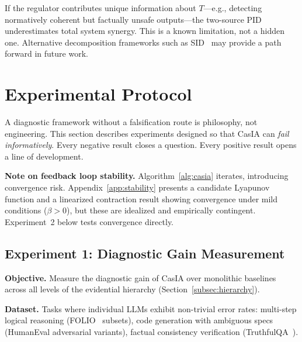 \documentclass[11pt,a4paper]{article}
\theoremstyle{definition}
\begin{document}
If the regulator contributes unique information about $T$---e.g., detecting normatively coherent but factually unsafe outputs---the two-source PID underestimates total system synergy. This is a known limitation, not a hidden one. Alternative decomposition frameworks such as SID~\cite{lyu2025multivariate} may provide a path forward in future work.


\section{Experimental Protocol}
\label{sec:experiments}

A diagnostic framework without a falsification route is philosophy, not engineering. This section describes experiments designed so that CasIA can \emph{fail informatively}. Every negative result closes a question. Every positive result opens a line of development.

\textbf{Note on feedback loop stability.} Algorithm~\ref{alg:casia} iterates, introducing convergence risk. Appendix~\ref{app:stability} presents a candidate Lyapunov function and a linearized contraction result showing convergence under mild conditions ($\beta > 0$), but these are idealized and empirically contingent. Experiment~2 below tests convergence directly.

\subsection{Experiment 1: Diagnostic Gain Measurement}

\textbf{Objective.} Measure the diagnostic gain of CasIA over monolithic baselines across all levels of the evidential hierarchy (Section~\ref{subsec:hierarchy}).

\textbf{Dataset.} Tasks where individual LLMs exhibit non-trivial error rates: multi-step logical reasoning (FOLIO~\cite{han2022folio} subsets), code generation with ambiguous specs (HumanEval adversarial variants), factual consistency verification (TruthfulQA~\cite{lin2022truthfulqa}).
\end{document}
